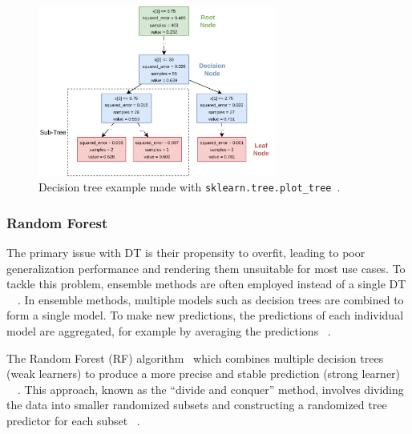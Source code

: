 {\begin{figure}[]
    \begin{tcolorbox}[arc=0pt,boxrule=0.5pt]
        \centering
        \includegraphics[width=0.7\textwidth]{chap4/images/decision_tree_example}
    \end{tcolorbox}
    \caption{Decision tree example made with \texttt{sklearn.tree.plot\_tree}~\cite{scikit-learn}.
    }
    \label{fig:dt-example}
\end{figure}

\subsubsection{Random Forest}\label{subsubsec:random-forests}
The primary issue with DT is their propensity to overfit, leading to poor generalization
performance and rendering them unsuitable for most use cases.
To tackle this problem, ensemble methods are often employed instead of a single
DT
~\cite[p. 83]{muller_introductionmachinelearning_2016}~\cite[p. 251]{liu_newmachinelearning_2012}.
In ensemble methods, multiple models such as decision trees are combined to form a single model.
To make new predictions, the predictions of each individual model are aggregated, for example by averaging the
predictions
~\cite[p. 222]{boehmke2019hands}.

The Random Forest (RF) algorithm~\cite[]{breiman_randomforests_2001} which combines multiple decision trees (weak
learners) to produce a more precise and stable prediction (strong learner)
~\cite[p. 24]{awad_efficientlearningmachines_2015}~\cite[pp. 340]{gareth2013introduction}.
This approach, known as the ``divide and conquer'' method, involves dividing the data into smaller randomized subsets
and constructing a randomized tree predictor for each subset
~\cite[p. 251]{liu_newmachinelearning_2012}.

}
